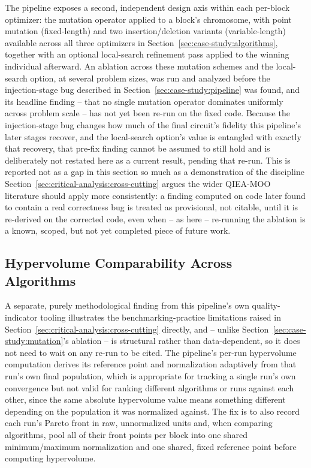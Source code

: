 The pipeline exposes a second, independent design axis within each
per-block optimizer: the mutation operator applied to a block's
chromosome, with point mutation (fixed-length) and two
insertion/deletion variants (variable-length) available across all
three optimizers in Section~\ref{sec:case-study:algorithms}, together
with an optional local-search refinement pass applied to the winning
individual afterward. An ablation across these mutation schemes and the
local-search option, at several problem sizes, was run and analyzed
before the injection-stage bug described in
Section~\ref{sec:case-study:pipeline} was found, and its headline
finding -- that no single mutation operator dominates uniformly across
problem scale -- has not yet been re-run on the fixed code. Because the
injection-stage bug changes how much of the final circuit's fidelity
this pipeline's later stages recover, and the local-search option's
value is entangled with exactly that recovery, that pre-fix finding
cannot be assumed to still hold and is deliberately not restated here as
a current result, pending that re-run. This is reported not as a gap in
this section so much as a demonstration of the discipline
Section~\ref{sec:critical-analysis:cross-cutting} argues the wider
QIEA-MOO literature should apply more consistently: a finding computed
on code later found to contain a real correctness bug is treated as
provisional, not citable, until it is re-derived on the corrected code,
even when -- as here -- re-running the ablation is a known, scoped, but
not yet completed piece of future work.

\subsection{Hypervolume Comparability Across Algorithms}
\label{sec:case-study:hypervolume}

A separate, purely methodological finding from this pipeline's own
quality-indicator tooling illustrates the benchmarking-practice
limitations raised in Section~\ref{sec:critical-analysis:cross-cutting}
directly, and -- unlike Section~\ref{sec:case-study:mutation}'s
ablation -- is structural rather than data-dependent, so it does not
need to wait on any re-run to be cited. The pipeline's per-run
hypervolume computation derives its reference point and normalization
adaptively from that run's own final population, which is appropriate
for tracking a single run's own convergence but not valid for ranking
different algorithms or runs against each other, since the same
absolute hypervolume value means something different depending on the
population it was normalized against. The fix is to also record each
run's Pareto front in raw, unnormalized units and, when comparing
algorithms, pool all of their front points per block into one shared
minimum/maximum normalization and one shared, fixed reference point
before computing hypervolume.

